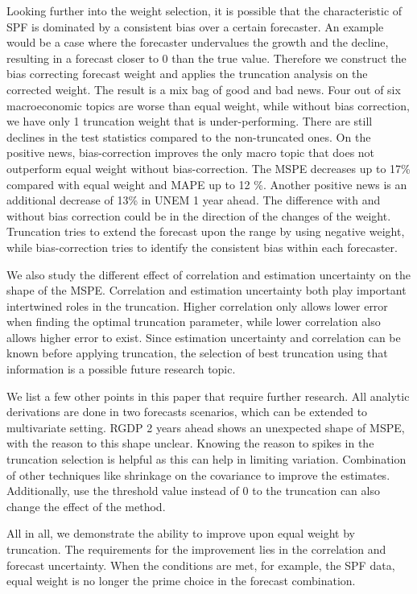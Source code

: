 \documentclass[11pt]{article}
\begin{document}
Looking further into the weight selection, it is possible that the characteristic of SPF is dominated by a consistent bias over a certain forecaster. An example would be a case where the forecaster undervalues the growth and the decline, resulting in a forecast closer to 0 than the true value. Therefore we construct the bias correcting forecast weight and applies the truncation analysis on the corrected weight. The result is a mix bag of good and bad news. Four out of six macroeconomic topics are worse than equal weight, while without bias correction, we have only 1 truncation weight that is under-performing. There are still declines in the test statistics compared to the non-truncated ones. On the positive news, bias-correction improves the only macro topic that does not outperform equal weight without bias-correction. The MSPE decreases up to 17\% compared with equal weight and MAPE up to 12 \%. Another positive news is an additional decrease of 13\% in UNEM 1 year ahead. The difference with and without bias correction could be in the direction of the changes of the weight. Truncation tries to extend the forecast upon the range by using negative weight, while bias-correction tries to identify the consistent bias within each forecaster.

We also study the different effect of correlation and estimation uncertainty on the shape of the MSPE. Correlation and estimation uncertainty both play important intertwined roles in the truncation. Higher correlation only allows lower error when finding the optimal truncation parameter, while lower correlation also allows higher error to exist. Since estimation uncertainty and correlation can be known before applying truncation, the selection of best truncation using that information is a possible future research topic.

We list a few other points in this paper that require further research. All analytic derivations are done in two forecasts scenarios, which can be extended to multivariate setting. 
RGDP 2 years ahead shows an unexpected shape of MSPE, with the reason to this shape unclear.
Knowing the reason to spikes in the truncation selection is helpful as this can help in limiting variation.
Combination of other techniques like shrinkage on the covariance to improve the estimates. Additionally, use the threshold value instead of 0 to the truncation can also change the effect of the method.

All in all, we demonstrate the ability to improve upon equal weight by truncation. The requirements for the improvement lies in the correlation and forecast uncertainty. When the conditions are met, for example, the SPF data, equal weight is no longer the prime choice in the forecast combination. 

\newpage



\end{document}
